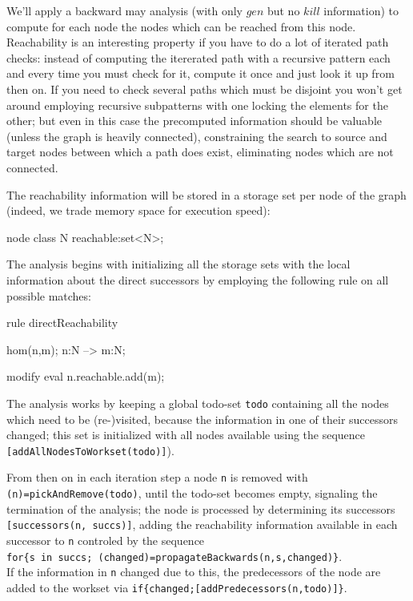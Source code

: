 We'll apply a backward may analysis (with only $gen$ but no $kill$ information) to compute for each node the nodes which can be reached from this node.
Reachability is an interesting property if you have to do a lot of iterated path checks:
instead of computing the itererated path with a recursive pattern each and every time you must check for it,
compute it once and just look it up from then on.
If you need to check several paths which must be disjoint you won't get around employing recursive subpatterns with one locking the elements for the other; but even in this case the precomputed information should be valuable (unless the graph is heavily connected), constraining the search to source and target nodes between which a path does exist, eliminating nodes which are not connected.

The reachability information will be stored in a storage set per node of the graph (indeed, we trade memory space for execution speed):
  \begin{example}
    \begin{grgen}
node class N
{
	reachable:set<N>;
}
    \end{grgen}
  \end{example}

The analysis begins with initializing all the storage sets with the local information about the direct successors by employing the following rule on all possible matches:
  \begin{example}
    \begin{grgen}
rule directReachability
{
  hom(n,m);
  n:N --> m:N;

  modify {
    eval { n.reachable.add(m); }
  }
}
    \end{grgen}
  \end{example}

The analysis works by keeping a global todo-set \verb#todo# containing all the nodes which need to be (re-)visited,
because the information in one of their successors changed;
this set is initialized with all nodes available using the sequence \verb#[addAllNodesToWorkset(todo)]#).

From then on in each iteration step a node \verb#n# is removed with \verb#(n)=pickAndRemove(todo)#, until the todo-set becomes empty, signaling the termination of the analysis; the node is processed by determining its successors \verb#[successors(n, succs)]#, adding the reachability information available in each successor to \verb#n# controled by the sequence\\
\verb#for{s in succs; (changed)=propagateBackwards(n,s,changed)}#.\\
If the information in \verb#n# changed due to this, the predecessors of the node are added to the workset via \verb#if{changed;[addPredecessors(n,todo)]}#.


